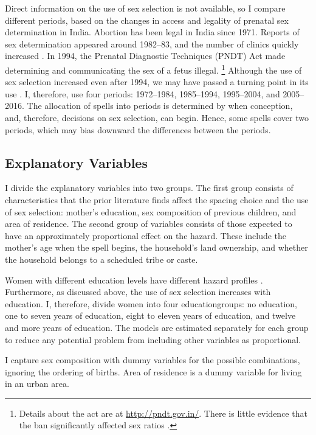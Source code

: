 \documentclass[12pt,letterpaper]{article}
\begin{document}
Direct information on the use of sex selection is not available, so I compare different 
periods, based on the changes in access and legality of prenatal sex 
determination in India.
Abortion has been legal in India since 1971.
Reports of sex determination appeared around 1982--83, and the number of clinics 
quickly increased \citep{Sudha1999,bhat06,Grover2006}.
In 1994, the Prenatal Diagnostic Techniques (PNDT) Act made determining and communicating 
the sex of a fetus illegal.%
\footnote{
Details about the act are at \href{http://pndt.gov.in/}{http://pndt.gov.in/}.
There is little evidence that the ban significantly affected sex ratios \citep{Das-Gupta2016}.
}
Although the use of sex selection increased even after 1994, we may have passed a 
turning point in its use \citep{Das_Gupta2009,Diamond-Smith2015}.
I, therefore, use four periods: 1972--1984, 1985--1994, 1995--2004, and 2005--2016.
The allocation of spells into periods is determined by when conception, and, therefore, 
decisions on sex selection, can begin. 
Hence, some spells cover two periods, which may bias downward the differences between the 
periods.


\subsection{Explanatory Variables}

I divide the explanatory variables into two groups.
The first group consists of characteristics that the prior literature finds affect 
the spacing choice and the use of sex selection:
mother's education, sex composition of previous children, and area of residence.
The second group of variables consists of those expected to have an approximately 
proportional effect on the hazard.
These include the mother's age when the spell begins, the household's
land ownership, and whether the household belongs to a scheduled tribe
or caste.

Women with different education levels have different hazard profiles
\citep{Whitworth2002,Bhalotra2008,Kim2010}.
Furthermore, as discussed above, the use of sex selection increases with education.
I, therefore, divide women into four educationgroups: no
education, one to seven years of education, eight to eleven years of education,
and twelve and more years of education.
The models are estimated separately for each group to reduce any
potential problem from including other variables as proportional.

I capture sex composition with dummy variables for the
possible combinations, ignoring the ordering of births.
Area of residence is a dummy variable for living in an urban area.
\end{document}
